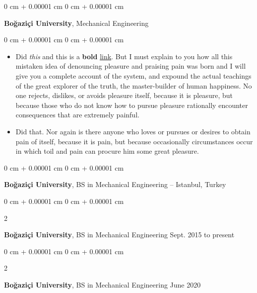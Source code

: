 \documentclass[10pt, letterpaper]{article}
\newenvironment{highlights}{
    \begin{itemize}[
        topsep=0.10 cm,
        parsep=0.10 cm,
        partopsep=0pt,
        itemsep=0pt,
        leftmargin=0 cm + 10pt
    ]
}{
    \end{itemize}
} %
\newenvironment{onecolentry}{
    \begin{adjustwidth}{
        0 cm + 0.00001 cm
    }{
        0 cm + 0.00001 cm
    }
}{
    \end{adjustwidth}
} %
\newenvironment{twocolentry}[2][]{
    \onecolentry
    \def\secondColumn{#2}
    \setcolumnwidth{\fill, 4.5 cm}
    \begin{paracol}{2}
}{
    \switchcolumn \raggedleft \secondColumn
    \end{paracol}
    \endonecolentry
} %
\begin{document}
        \begin{onecolentry}
            \textbf{Boğaziçi University}, Mechanical Engineering\end{onecolentry}

        \vspace{0.10 cm}
        \begin{onecolentry}
            \begin{highlights}
                \item Did \textit{this} and this is a \textbf{bold} \href{https://example.com}{link}. But I must explain to you how all this mistaken idea of denouncing pleasure and praising pain was born and I will give you a complete account of the system, and expound the actual teachings of the great explorer of the truth, the master-builder of human happiness. No one rejects, dislikes, or avoids pleasure itself, because it is pleasure, but because those who do not know how to pursue pleasure rationally encounter consequences that are extremely painful.
                \item Did that. Nor again is there anyone who loves or pursues or desires to obtain pain of itself, because it is pain, but because occasionally circumstances occur in which toil and pain can procure him some great pleasure.
            \end{highlights}
        \end{onecolentry}


        \vspace{0.2 cm}

        \begin{onecolentry}
            \textbf{Boğaziçi University}, BS in Mechanical Engineering -- Istanbul, Turkey\end{onecolentry}



        \vspace{0.2 cm}

        \begin{twocolentry}{
            Sept. 2015 to present
        }
            \textbf{Boğaziçi University}, BS in Mechanical Engineering\end{twocolentry}



        \vspace{0.2 cm}

        \begin{twocolentry}{
            June 2020
        }
            \textbf{Boğaziçi University}, BS in Mechanical Engineering\end{twocolentry}
\end{document}
